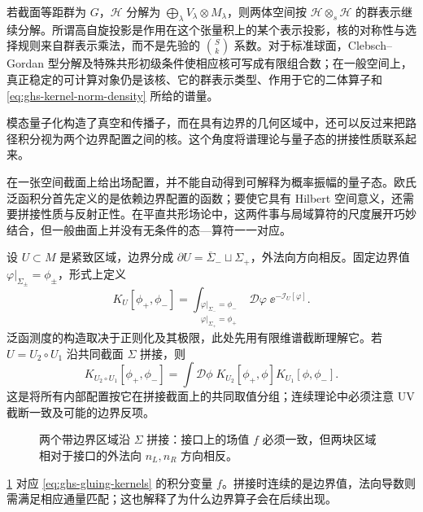 若截面等距群为 $G$，$\mathscr H$ 分解为 $\bigoplus_\lambda V_\lambda\otimes M_\lambda$，则两体空间按 $\mathscr H\otimes_s\mathscr H$ 的群表示继续分解。所谓高自旋投影是作用在这个张量积上的某个表示投影，核的对称性与选择规则来自群表示乘法，而不是先验的 $\binom Sk$ 系数。对于标准球面，Clebsch--Gordan 型分解及特殊共形初级条件使相应核可写成有限组合数；在一般空间上，真正稳定的可计算对象仍是该核、它的群表示类型、作用于它的二体算子和 \cref{eq:ghs-kernel-norm-density} 所给的谱量。


模态量子化构造了真空和传播子，而在具有边界的几何区域中，还可以反过来把路径积分视为两个边界配置之间的核。这个角度将谱理论与量子态的拼接性质联系起来。


在一张空间截面上给出场配置，并不能自动得到可解释为概率振幅的量子态。欧氏泛函积分首先定义的是依赖边界配置的函数；要使它具有 Hilbert 空间意义，还需要拼接性质与反射正性。在平直共形场论中，这两件事与局域算符的尺度展开巧妙结合，但一般曲面上并没有无条件的态—算符一一对应。


设 $U\subset M$ 是紧致区域，边界分成 $\partial U=\overline\Sigma_-\sqcup\Sigma_+$，外法向方向相反。固定边界值 $\varphi|_{\Sigma_\pm}=\phi_\pm$，形式上定义
\begin{equation}\label{eq:ghs-euclidean-transfer-kernel}
 K_U[\phi_+,\phi_-]
 =\int_{\substack{\varphi|_{\Sigma_-}=\phi_-\\\varphi|_{\Sigma_+}=\phi_+}}
 \mathcal D\varphi\;\ee^{-\mathscr I_U[\varphi]}.
\end{equation}
泛函测度的构造取决于正则化及其极限，此处先用有限维谱截断理解它。若 $U=U_2\circ U_1$ 沿共同截面 $\Sigma$ 拼接，则
\begin{equation}\label{eq:ghs-gluing-kernels}
 K_{U_2\circ U_1}[\phi_+ ,\phi_-]
 =\int\mathcal D\phi\;K_{U_2}[\phi_+,\phi]K_{U_1}[\phi,\phi_-].
\end{equation}
这是将所有内部配置按它在拼接截面上的共同取值分组；连续理论中必须注意 UV 截断一致及可能的边界反项。

\begin{figure}[htbp]
\centering

\caption{两个带边界区域沿 $\Sigma$ 拼接：接口上的场值 $f$ 必须一致，但两块区域相对于接口的外法向 $n_L,n_R$ 方向相反。}\label{fig:ghs-boundary-gluing}
\end{figure}

\cref{fig:ghs-boundary-gluing} 对应 \cref{eq:ghs-gluing-kernels} 的积分变量 $f$。拼接时连续的是边界值，法向导数则需满足相应通量匹配；这也解释了为什么边界算子会在后续出现。



